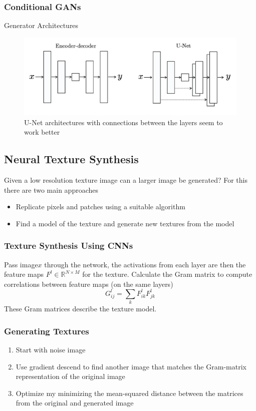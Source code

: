 \documentclass[11pt]{article}
\theoremstyle{definition}
\newcommand*\R{\mathbb{R}}
\begin{document}
\subsubsection{Conditional GANs}
Generator Architectures
\begin{figure}[H]
	\centering
	\includegraphics[width=0.7\linewidth]{img/conditional_GAN_generator_architectures}
	\caption{U-Net architectures with connections between the layers seem to work better}
	\label{fig:conditionalgangeneratorarchitectures}
\end{figure}

\subsection{Neural Texture Synthesis}
Given a low resolution texture image can a larger image be generated? For this there are two main approaches
\begin{itemize}[label=-]
	\item Replicate pixels and patches using a suitable algorithm
	\item Find a model of the texture and generate new textures from the model
\end{itemize}

\subsubsection{Texture Synthesis Using CNNs}
Pass image$x$ through the network, the activations from each layer are then the feature maps $F^l \in \R^{N\times M}$ for the texture. Calculate the Gram matrix to compute correlations between feature maps (on the same layers)
\begin{equation*}
	G_{ij}^l = \sum_{k} F_{ik}^l F_{jk}^l
\end{equation*}
These Gram matrices describe the texture model.

\subsubsection{Generating Textures}
\begin{enumerate}[itemsep=0em]
	\item Start with noise image
	\item Use gradient descend to find another image that matches the Gram-matrix representation of the original image
	\item Optimize my minimizing the mean-squared distance between the matrices from the original and generated image
\end{enumerate}
\end{document}
